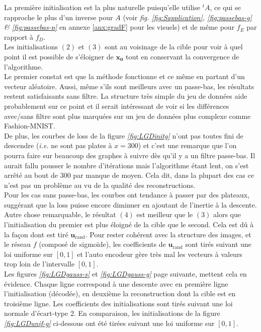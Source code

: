 \documentclass[hidelinks, french]{article} %
\newcommand{\ie}{\textit{i.e. }}
\renewcommand{\bf}[1]{\boldsymbol{#1}}
\theoremstyle{enonce}
\theoremstyle{special}
\theoremstyle{rq}
\theoremstyle{exo}
\theoremstyle{demo}
\begin{document}
\noindent La première initialisation est la plus naturelle puisqu'elle utilise $^tA$, ce qui se rapproche le plus d'un inverse pour $A$ (voir \textit{fig. \ref{fig:Sapplication}, \ref{fig:passebas-g} \& \ref{fig:passebas-p}} en annexe \ref{anx:gradF} pour les visuels) et de même pour $f_E$ par rapport à $f_D$.
\\
Les initialisations $(2)$ et $(3)$ sont au voisinage de la cible pour voir à quel point il est possible de s'éloigner de $\bf{x_0}$ tout en conservant la convergence de l'algorithme.
\\

Le premier constat est que la méthode fonctionne et ce même en partant d'un vecteur aléatoire.  Aussi, même s'ils sont meilleurs avec un passe-bas, les résultats restent satisfaisants sans filtre. La structure très simple du jeu de données aide probablement sur ce point et il serait intéressant de voir si les différences avec/sans filtre sont plus marquées sur un jeu de données plus complexe comme Fashion-MNIST.
\\
De plus, les courbes de loss de la figure \textit{\ref{fig:LGDinitg}} n'ont pas toutes fini de descendre (\ie ne sont pas plates à $x=300$) et c'est une remarque que l'on pourra faire sur beaucoup des graphes à suivre dès qu'il y a un filtre passe-bas. Il aurait fallu pousser le nombre d'itérations mais l'algorithme étant lent, on s'est arrêté au bout de 300 par manque de moyen. Cela dit, dans la plupart des cas ce n'est pas un problème au vu de la qualité des reconstructions.
\\
Pour les cas sans passe-bas, les courbes ont tendance à passer par des plateaux, suggérant que la loss puisse encore diminuer en ajoutant de l’inertie à la descente.
\\

Autre chose remarquable, le résultat $(4)$ est meilleur que le $(3)$ alors que l'initialisation du premier est plus éloigné de la cible que le second. Cela est dû à la façon dont est tiré $\bf{u}_{\text{rand}}$. Pour rester cohérent avec la structure des images, et le réseau $f$ (composé de sigmoïde), les coefficients de $\bf{u}_{\text{rand}}$ sont tirés suivant une loi uniforme sur $[0,1]$ et l'auto encodeur gère très mal les vecteurs à valeurs trop loin de l'intervalle $[0,1]$.
\\
Les figures \textit{\ref{fig:LGDgauss-s}} et \textit{\ref{fig:LGDgauss-g}} page suivante, mettent cela en évidence. Chaque ligne correspond à une descente avec en première ligne l'initialisation (décodée), en deuxième la reconstruction dont la cible est en troisième ligne. Les coefficients des initialisations sont tirés suivant une loi normale d'écart-type 2. En comparaison, les initialisations de la figure \textit{\ref{fig:LGDunif-g}} ci-dessous ont été tirées suivant une loi uniforme sur $[0,1]$.
\end{document}
